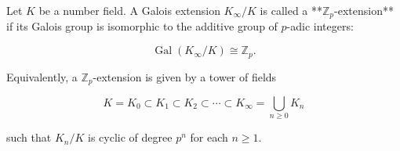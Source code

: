 Let $K$ be a number field. A Galois extension $K_\infty / K$ is called a **$\mathbb{Z}_p$-extension** if its Galois group is isomorphic to the additive group of $p$-adic integers:

$$\operatorname{Gal}(K_\infty / K) \cong \mathbb{Z}_p.$$

Equivalently, a $\mathbb{Z}_p$-extension is given by a tower of fields

$$K = K_0 \subset K_1 \subset K_2 \subset \cdots \subset K_\infty = \bigcup_{n \geq 0} K_n$$

such that $K_n / K$ is cyclic of degree $p^n$ for each $n \geq 1$.
